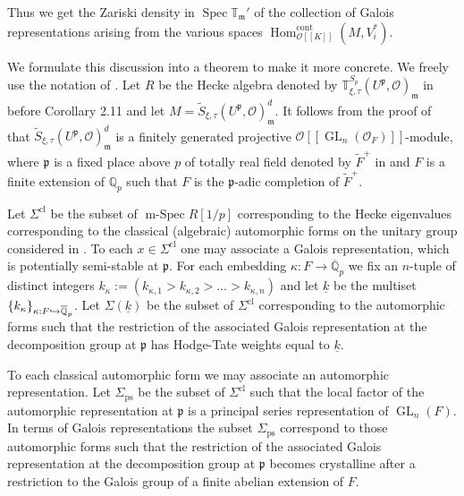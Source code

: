 \documentclass[11pt]{article}
\let\mathcal\mathscr
\newcommand\hto{\mathrel{\lhook\joinrel\to}}
\newcommand{\rps}{\mathrm{ps}}
\theoremstyle{definition}
\DeclareMathOperator{\Hom}{Hom}
\DeclareMathOperator{\GL}{GL}
\DeclareMathOperator{\Spec}{Spec}
\DeclareMathOperator{\mSpec}{m-Spec}
\newcommand{\br}[1]{[\![#1]\!]}
\newcommand{\Qp}{\mathbb {Q}_p}
\newcommand{\Qpbar}{\overline{\mathbb{Q}}_p}
\newcommand{\mm}{\mathfrak m}
\newcommand{\cO}{\mathcal{O}}
\newcommand{\TT}{\mathbb T}
\newcommand{\pp}{\mathfrak p}
\newcommand{\cont}{\mathrm{cont}}
\begin{document}
Thus we get the Zariski density in $\Spec \mathbb T_{\mathfrak m}'$
of the collection of Galois representations arising from the various spaces
$\Hom_{\mathcal O\br{K}}^{\cont}(M,V_i^*).$

We formulate this discussion into a theorem to make it more concrete. We freely use the notation of \cite{six-authors}.
Let $R$ be the Hecke algebra denoted by
$\TT^{S_p}_{\xi, \tau}(U^{\pp}, \cO)_{\mm}$ in \cite{six-authors} before Corollary 2.11 and let $M= \tilde{S}_{\xi, \tau}(U^\pp, \cO)^d_\mm$.
It follows from the proof of \cite[Prop.\,2.10]{six-authors} that $\tilde{S}_{\xi, \tau}(U^\pp, \cO)^d_\mm$ is a finitely generated projective
$\cO\br{\GL_n(\cO_F)}$-module, where $\pp$ is a fixed place above $p$ of totally real field denoted by $\widetilde{F}^+$ in \cite{six-authors} and
$F$ is a finite extension of $\Qp$ such that $F$ is the $\pp$-adic completion of $\widetilde{F}^+$.

Let $\Sigma^{\mathrm{cl}}$ be the subset of $\mSpec R[1/p]$ corresponding to the Hecke eigenvalues corresponding
to the classical (algebraic) automorphic forms on the unitary group considered in \cite[\S 2.3]{six-authors}. To each $x\in \Sigma^{\mathrm{cl}}$
one may associate a Galois representation, which is potentially semi-stable at $\pp$. For each embedding $\kappa: F\to \Qpbar$ we fix
an $n$-tuple of distinct integers $k_{\kappa}:=(k_{\kappa, 1}> k_{\kappa, 2} > \ldots > k_{\kappa, n})$ and let $\underline{k}$ be the multiset
$\{k_\kappa\}_{\kappa: F \hto \Qpbar}$. Let $\Sigma(\underline{k})$ be the subset of $\Sigma^{\mathrm{cl}}$
corresponding to the automorphic forms such that the restriction of the associated Galois representation at the decomposition group at $\pp$
has Hodge-Tate weights equal to $\underline{k}$.

To each classical automorphic form we may associate an automorphic representation. Let $\Sigma_{\rps}$ be the subset of $\Sigma^{\mathrm{cl}}$ such that
the local factor of the automorphic representation at $\pp$ is a principal series representation of $\GL_n(F)$. In terms of Galois representations
the subset $\Sigma_{\rps}$ correspond to those automorphic forms such that the restriction of the associated Galois representation at the decomposition group at $\pp$ becomes crystalline after a restriction to the Galois group of a finite abelian extension of $F$.
\end{document}

